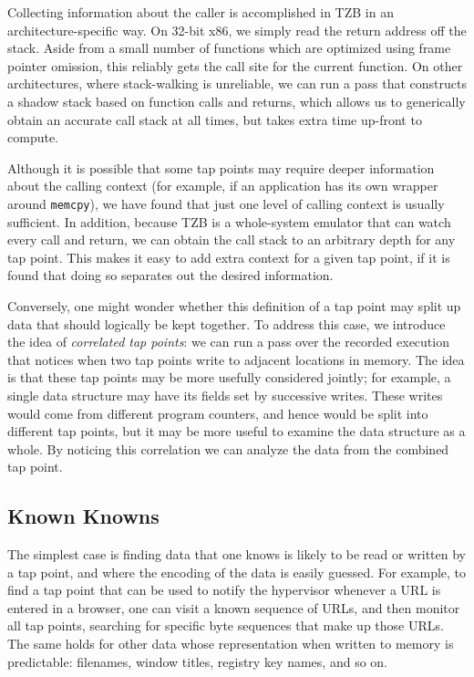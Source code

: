 Collecting information about the caller is accomplished in TZB in an
architecture-specific way. On 32-bit x86, we simply read the return
address off the stack. Aside from a small number of functions which are
optimized using frame pointer omission, this reliably gets the call site
for the current function. On other architectures, where stack-walking is
unreliable, we can run a pass that constructs a shadow stack based on
function calls and returns, which allows us to generically obtain an
accurate call stack at all times, but takes extra time up-front to
compute.

Although it is possible that some tap points may require deeper
information about the calling context (for example, if an application
has its own wrapper around \texttt{memcpy}), we have found that just one
level of calling context is usually sufficient. In addition, because TZB
is a whole-system emulator that can watch every call and return, we can
obtain the call stack to an arbitrary depth for any tap point. This
makes it easy to add extra context for a given tap point, if it is found
that doing so separates out the desired information.

 Conversely, one might wonder whether this
definition of a tap point may split up data that should logically be
kept together. To address this case, we introduce the idea of
\emph{correlated tap points}: we can run a pass over the recorded
execution that notices when two tap points write to adjacent locations
in memory. The idea is that these tap points may be more usefully
considered jointly; for example, a single data structure may have its
fields set by successive writes. These writes would come from different
program counters, and hence would be split into different tap points,
but it may be more useful to examine the data structure as a whole. By
noticing this correlation we can analyze the data from the combined tap
point.

\subsection{Known Knowns}

The simplest case is finding data that one knows is likely to be read or
written by a tap point, and where the encoding of the data is easily
guessed. For example, to find a tap point that can be used to notify
the hypervisor whenever a URL is entered in a browser, one can visit a
known sequence of URLs, and then monitor all tap points, searching for
specific byte sequences that make up those URLs. The same holds for
other data whose representation when written to memory is predictable:
filenames, window titles, registry key names, and so on.

